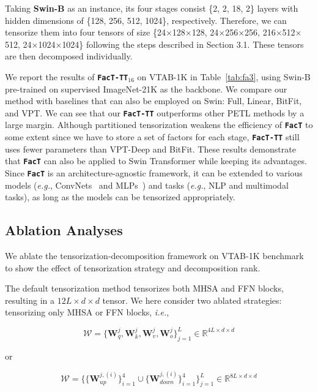 Taking \textbf{Swin-B} as an instance, its four stages consist \{2, 2, 18, 2\} layers with hidden dimensions of \{128, 256, 512, 1024\}, respectively. Therefore, we can tensorize them into four tensors of size \{24$\times$128$\times$128, 24$\times$256$\times$256, 216$\times$512$\times$512, 24$\times$1024$\times$1024\} following the steps described in Section 3.1. These tensors are then decomposed individually. 

We report the results of \texttt{\textbf{FacT-TT}}$_{16}$ on VTAB-1K in Table~\ref{tab:fa3}, using Swin-B pre-trained on supervised ImageNet-21K as the backbone. We compare our method with baselines that can also be employed on Swin: Full, Linear, BitFit, and VPT. We can see that our \texttt{\textbf{FacT-TT}} outperforms other PETL methods by a large margin. Although partitioned tensorization weakens the efficiency of \texttt{\textbf{FacT}} to some extent since we have to store a set of factors for each stage, \texttt{\textbf{FacT-TT}} still uses fewer parameters than VPT-Deep and BitFit. These results demonstrate that \texttt{\textbf{FacT}} can also be applied to Swin Transformer while keeping its advantages. Since \texttt{\textbf{FacT}} is an architecture-agnostic framework, it can be extended to various models (\emph{e.g.}, ConvNets~\cite{convnext} and MLPs~\cite{mlp,asmlp}) and tasks (\emph{e.g.}, NLP and multimodal tasks), as long as the models can be tensorized appropriately. 

\subsection{Ablation Analyses} We ablate the tensorization-decomposition framework on VTAB-1K benchmark to show the effect of tensorization strategy and decomposition rank.

The default tensorization method tensorizes both MHSA and FFN blocks, resulting in a $12L\times d\times d$ tensor. We here consider two ablated strategies: tensorizing only MHSA or FFN blocks, \emph{i.e.},

\begin{equation}
    \boldsymbol{\mathcal{W}}=\big\{\boldsymbol{W}_q^j, \boldsymbol{W}_k^j, \boldsymbol{W}_v^j, \boldsymbol{W}_o^j\big\}_{j=1}^{L} \in \mathbb{R}^{4L\times d\times d}
\end{equation}

or

\begin{equation}
    \boldsymbol{\mathcal{W}}=\big\{\{\boldsymbol{W}_{up}^{j,(i)}\}^{4}_{i=1}\cup \{\boldsymbol{W}_{down}^{j,(i)}\}^{4}_{i=1} \big\}_{j=1}^{L} \in \mathbb{R}^{8L\times d\times d}
\end{equation}

